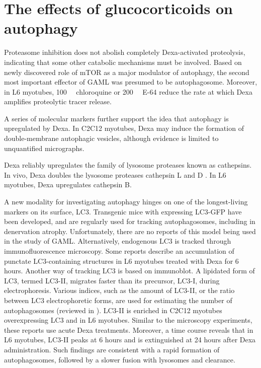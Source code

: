 \documentclass[12pt,english]{report}\usepackage[]{graphicx}\usepackage[]{color}
\begin{document}
\section{The effects of glucocorticoids on autophagy}

Proteasome inhibition does not abolish completely Dexa-activated proteolysis,
indicating that some other catabolic mechanisms must be involved.
Based on newly discovered role of mTOR as a major modulator of autophagy,
the second most important effector of GAML was presumed to be autophagosome.
Moreover, in L6 myotubes, \SI{100}{\micro\molar} chloroquine or \SI{200}{\milli\molar}
E-64 reduce the rate at which Dexa amplifies proteolytic tracer release\citep{wang1998dexamethasone}.

A series of molecular markers further support the idea that autophagy
is upregulated by Dexa. In C2C12 myotubes, Dexa may induce the formation
of double-membrane autophagic vesicles, although evidence is limited
to unquantified micrographs\citep{rossi2009cytosolic}.

Dexa reliably upregulates the family of lysosome proteases known as
cathepsins. In vivo, Dexa doubles the lysosome proteases cathepsin
L and D \citep{dardevet1995sensitivity,deval2001identification,nishimura2008effects}.
In L6 myotubes, Dexa upregulates cathepsin B\citep{wang1998dexamethasone}.

A new modality for investigating autophagy hinges on one of the longest-living
markers on its surface, LC3. Transgenic mice with expressing LC3-GFP
have been developed, and are regularly used for tracking autophagosomes,
including in denervation atrophy. Unfortunately, there are no reports
of this model being used in the study of GAML. Alternatively, endogenous
LC3 is tracked through immunofluorescence microscopy. Some reports
describe an accumulation of punctate LC3-containing structures in
L6 myotubes treated with Dexa for 6 hours\citep{giron2015beta-hydroxy-beta-methylbutyrate}.
Another way of tracking LC3 is based on immunoblot. A lipidated form
of LC3, termed LC3-II, migrates faster than its precursor, LC3-I,
during electrophoresis. Various indices, such as the amount of LC3-II,
or the ratio between LC3 electrophoretic forms, are used for estimating
the number of autophagosomes (reviewed in \citep{mizushima2007how}).
LC3-II is enriched in C2C12 myotubes overexpressing LC3\citep{rossi2009cytosolic}
and in L6 myotubes\citep{giron2015beta-hydroxy-beta-methylbutyrate}.
Similar to the microscopy experiments, these reports use acute Dexa
treatments. Moreover, a time course reveals that in L6 myotubes, LC3-II
peaks at 6 hours and is extinguished at 24 hours after Dexa administration\citep{troncoso2014dexamethasone-induced}.
Such findings are consistent with a rapid formation of autophagosomes,
followed by a slower fusion with lysosomes and clearance.
\end{document}
